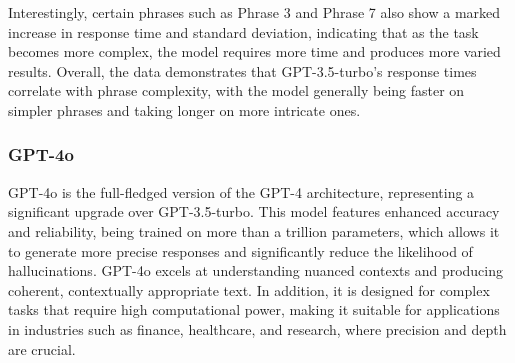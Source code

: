 Interestingly, certain phrases such as Phrase 3 and Phrase 7 also show a marked increase in response time and standard deviation, indicating that as the task becomes more complex, the model requires more time and produces more varied results. Overall, the data demonstrates that GPT-3.5-turbo's response times correlate with phrase complexity, with the model generally being faster on simpler phrases and taking longer on more intricate ones.

\subsubsection{GPT-4o}

GPT-4o is the full-fledged version of the GPT-4 architecture, representing a significant upgrade over GPT-3.5-turbo. This model features enhanced accuracy and reliability, being trained on more than a trillion parameters, which allows it to generate more precise responses and significantly reduce the likelihood of hallucinations. GPT-4o excels at understanding nuanced contexts and producing coherent, contextually appropriate text. In addition, it is designed for complex tasks that require high computational power, making it suitable for applications in industries such as finance, healthcare, and research, where precision and depth are crucial.

